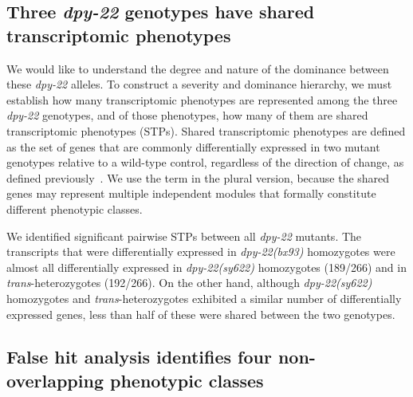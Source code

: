 \documentclass[9pt,twocolumn,twoside]{gsajnl}
\newcommand{\gene}[1]{\mbox{\emph{#1}}}
\newcommand{\dpy}[1]{\gene{dpy-22#1}}
\newcommand{\weakn}{266}
\newcommand{\bx}{\dpy{(bx93)}}
\newcommand{\sy}{\dpy{(sy622)}}
\begin{document}
\subsection*{Three \dpy{} genotypes have shared transcriptomic
             phenotypes}
We would like to understand the degree and nature of the dominance
between these \dpy{} alleles. To construct a severity and dominance hierarchy,
we must establish how many transcriptomic phenotypes are represented among the
three \dpy{} genotypes, and of those phenotypes, how many of them are shared
transcriptomic phenotypes (STPs). Shared transcriptomic phenotypes are defined
as the set of genes that are commonly differentially expressed in two mutant
genotypes relative to a wild-type control, regardless of the direction of
change, as defined previously~\citep{AngelesAlboresHIF}. We use the term in the
plural version, because the shared genes may represent multiple independent
modules that formally constitute different phenotypic classes.

We identified significant pairwise STPs between all \dpy{} mutants. The
transcripts that were differentially expressed in \bx{} homozygotes were almost
all differentially expressed in \sy{} homozygotes (189/\weakn{}) and in
\emph{trans}-heterozygotes (192/\weakn{}). On the other hand, although \sy{}
homozygotes and \emph{trans}-heterozygotes exhibited a similar number of
differentially expressed genes, less than half of these were shared between the
two genotypes.

\subsection*{False hit analysis identifies four non-overlapping phenotypic
             classes}
\end{document}
